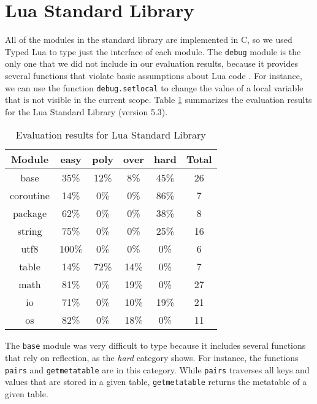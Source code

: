 \section{Lua Standard Library}

All of the modules in the standard library are implemented in C, so
we used Typed Lua to type just the interface of each module.
The \texttt{debug} module is the only one that we did not include in our
evaluation results, because it provides several functions that violate
basic assumptions about Lua code \citep{luamanual}.
For instance, we can use the function \texttt{debug.setlocal} to change the value
of a local variable that is not visible in the current scope.
Table \ref{tab:evallsl} summarizes the evaluation results for the Lua Standard Library
(version 5.3).

\begin{table}[!ht]
\begin{center}
\begin{tabular}{|c|c|c|c|c|c|}
\hline
\textbf{Module} & \textbf{easy} & \textbf{poly} & \textbf{over} & \textbf{hard} & \textbf{Total} \\
\hline
base & 35\% & 12\% & 8\% & 45\% & 26 \\ %
\hline
coroutine & 14\% & 0\% & 0\% & 86\% & 7 \\ %
\hline
package & 62\% & 0\% & 0\% & 38\% & 8 \\ %
\hline
string & 75\% & 0\% & 0\% & 25\% & 16 \\ %
\hline
utf8 & 100\% & 0\% & 0\% & 0\% & 6 \\ %
\hline
table & 14\% & 72\% & 14\% & 0\% & 7 \\ %
\hline
math & 81\% & 0\% & 19\% & 0\% & 27 \\ %
\hline
io & 71\% & 0\% & 10\% & 19\% & 21 \\ %
\hline
os & 82\% & 0\% & 18\% & 0\% & 11 \\ %
\hline
\end{tabular}
\end{center}
\caption{Evaluation results for Lua Standard Library}
\label{tab:evallsl}
\end{table}

The \texttt{base} module was very difficult to type
because it includes several functions that rely on reflection,
as the \emph{hard} category shows.
For instance, the functions \texttt{pairs} and \texttt{getmetatable}
are in this category.
While \texttt{pairs} traverses all keys and values that are stored
in a given table, \texttt{getmetatable} returns the metatable of a
given table.


